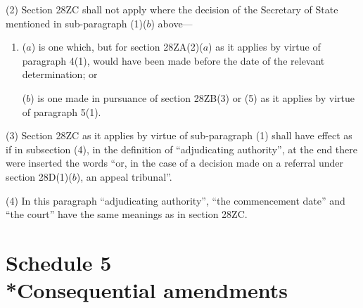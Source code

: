 \documentclass[12pt,a4paper]{article}
\begin{document}
(2) Section 28ZC shall not apply where the decision of the Secretary of State mentioned in sub-paragraph (1)($b$) above—
\begin{enumerate}\item[]
($a$) is one which, but for section 28ZA(2)($a$) as it applies by virtue of paragraph 4(1), would have been made before the date of the relevant determination; or

($b$) is one made in pursuance of section 28ZB(3) or (5) as it applies by virtue of paragraph 5(1).
\end{enumerate}

(3) Section 28ZC as it applies by virtue of sub-paragraph (1) shall have effect as if in subsection (4), in the definition of “adjudicating authority”, at the end there were inserted the words “or, in the case of a decision made on a referral under section 28D(1)($b$), an appeal tribunal”.

(4) In this paragraph “adjudicating authority”, “the commencement date” and “the court” have the same meanings as in section 28ZC.

\part[Schedule 5 --- Consequential amendments]{Schedule 5\\*Consequential amendments}

\renewcommand\parthead{--- Schedule 5}


%
%
%
%
\end{document}
